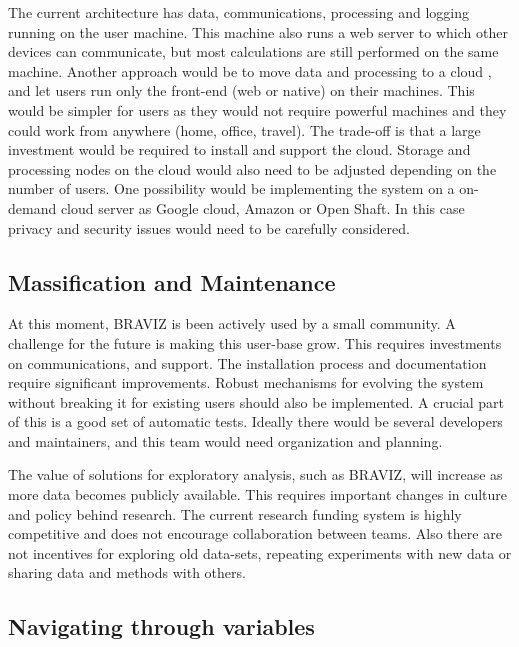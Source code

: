 The current architecture has data, communications, processing and logging running on the user machine. This machine also runs a web server to  which other devices can communicate, but most calculations are still performed on the same machine. Another approach would be to move data and processing to a cloud , and let users run only the front-end (web or native) on their machines. This would be simpler for users as they would not require powerful machines and they could work from anywhere (home, office, travel). The trade-off is that a large investment would be required  to install and support the cloud. Storage and processing nodes on the cloud would also need to be adjusted depending on the number of users. One possibility would be implementing the system on a on-demand cloud server as Google cloud, Amazon or Open Shaft. In this case privacy and security issues would need to be carefully considered. 


\subsection{Massification and Maintenance}

At this moment, BRAVIZ is been actively used by a small community. A challenge for the future is making this user-base grow. This requires investments on communications, and support. The installation process and documentation require significant improvements. Robust mechanisms for evolving the system without breaking it for existing users should also be implemented. A crucial part of this is a good set of automatic tests. Ideally there would be several developers and maintainers, and this team would need organization and planning.

The value of solutions for exploratory analysis, such as BRAVIZ, will increase as more data becomes publicly available. This requires important changes in  culture and policy behind research. The current research funding system is highly competitive and does not encourage collaboration between teams. Also there are not incentives for exploring old data-sets, repeating experiments with new data or sharing data and methods with others. 

\subsection{Navigating through variables}

